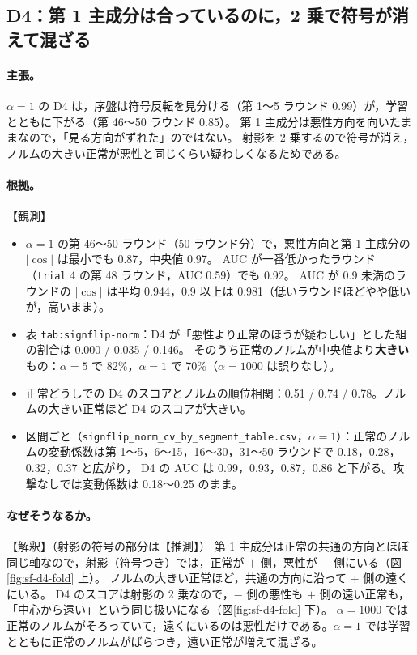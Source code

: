 \documentclass[a4j, dvipdfmx]{jsarticle}  %
\begin{document}
\subsection{D4：第 1 主成分は合っているのに，2 乗で符号が消えて混ざる}
\label{sec:claim-sf-d4}

\paragraph{主張。}
$\alpha = 1$ の D4 は，序盤は符号反転を見分ける（第 1〜5 ラウンド 0.99）が，学習とともに下がる（第 46〜50 ラウンド 0.85）。
第 1 主成分は悪性方向を向いたままなので，「見る方向がずれた」のではない。
射影を 2 乗するので符号が消え，ノルムの大きい正常が悪性と同じくらい疑わしくなるためである。

\paragraph{根拠。}【観測】
\begin{itemize}
  \item $\alpha = 1$ の第 46〜50 ラウンド（50 ラウンド分）で，悪性方向と第 1 主成分の $|\cos|$ は最小でも 0.87，中央値 0.97。
        AUC が一番低かったラウンド（\texttt{trial} 4 の第 48 ラウンド，AUC 0.59）でも 0.92。
        AUC が 0.9 未満のラウンドの $|\cos|$ は平均 0.944，0.9 以上は 0.981（低いラウンドほどやや低いが，高いまま）。
  \item 表 \texttt{tab:signflip-norm}：D4 が「悪性より正常のほうが疑わしい」とした組の割合は 0.000 / 0.035 / 0.146。
        そのうち正常のノルムが中央値より\textbf{大きい}もの：$\alpha = 5$ で 82\%，$\alpha = 1$ で 70\%（$\alpha = 1000$ は誤りなし）。
  \item 正常どうしでの D4 のスコアとノルムの順位相関：0.51 / 0.74 / 0.78。ノルムの大きい正常ほど D4 のスコアが大きい。
  \item 区間ごと（\texttt{signflip\_norm\_cv\_by\_segment\_table.csv}，$\alpha = 1$）：正常のノルムの変動係数は第 1〜5，6〜15，16〜30，31〜50 ラウンドで 0.18，0.28，0.32，0.37 と広がり，
        D4 の AUC は 0.99，0.93，0.87，0.86 と下がる。攻撃なしでは変動係数は 0.18〜0.25 のまま。
\end{itemize}

\paragraph{なぜそうなるか。}【解釈】（射影の符号の部分は【推測】）
第 1 主成分は正常の共通の方向とほぼ同じ軸なので，射影（符号つき）では，正常が $+$ 側，悪性が $-$ 側にいる（図\ref{fig:sf-d4-fold} 上）。
ノルムの大きい正常ほど，共通の方向に沿って $+$ 側の遠くにいる。
D4 のスコアは射影の 2 乗なので，$-$ 側の悪性も $+$ 側の遠い正常も，「中心から遠い」という同じ扱いになる（図\ref{fig:sf-d4-fold} 下）。
$\alpha = 1000$ では正常のノルムがそろっていて，遠くにいるのは悪性だけである。$\alpha = 1$ では学習とともに正常のノルムがばらつき，遠い正常が増えて混ざる。
\end{document}
